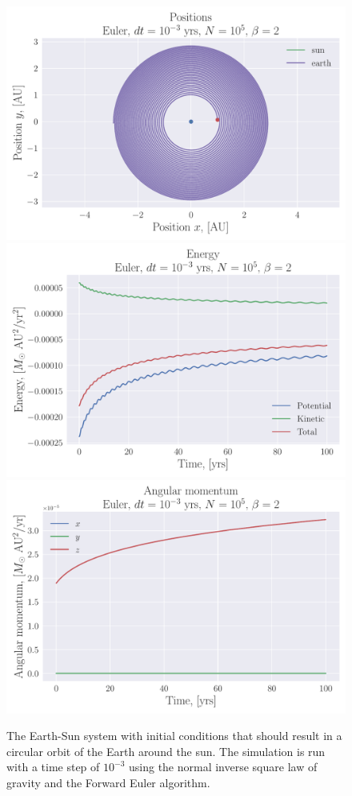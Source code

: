 \documentclass[reprint, english,notitlepage,nofootinbib]{revtex4-1}  %
\begin{document}
\begin{figure}
  \includegraphics[width=\linewidth]{../output/earth_sun_circ-euler-3-5-2.pdf}
  \includegraphics[width=\linewidth]{../output/earth_sun_circ-euler-3-5-2_energy.pdf}
  \includegraphics[width=\linewidth]{../output/earth_sun_circ-euler-3-5-2_ang_mom.pdf}
  \caption{The Earth-Sun system with initial conditions that should result in a circular orbit of the Earth around the sun. The simulation is run with a time step of $10^{-3}$ using the normal inverse square law of gravity and the Forward Euler algorithm.}
  \label{fig:earth_sun_circ_euler_dt=3}
\end{figure}
\end{document}
